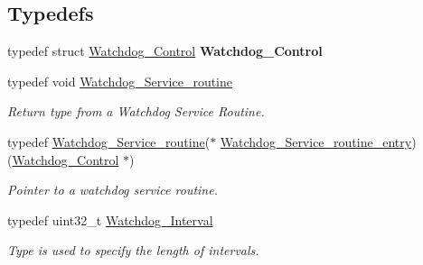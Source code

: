 \subsection*{Typedefs}
\begin{DoxyCompactItemize}
\item 
\mbox{\label{group__RTEMSScoreWatchdog_ga684404081cd268ce43ec92e6461771ab}} 
typedef struct \mbox{\hyperlink{structWatchdog__Control}{Watchdog\+\_\+\+Control}} {\bfseries Watchdog\+\_\+\+Control}
\item 
typedef void \mbox{\hyperlink{group__RTEMSScoreWatchdog_ga717c3247e44529ca6c68ead7baf52217}{Watchdog\+\_\+\+Service\+\_\+routine}}
\begin{DoxyCompactList}\small\item\em Return type from a Watchdog Service Routine. \end{DoxyCompactList}\item 
typedef \mbox{\hyperlink{group__RTEMSScoreWatchdog_ga717c3247e44529ca6c68ead7baf52217}{Watchdog\+\_\+\+Service\+\_\+routine}}($\ast$ \mbox{\hyperlink{group__RTEMSScoreWatchdog_ga6ae5e52f6c4046535272c18a8cba66e1}{Watchdog\+\_\+\+Service\+\_\+routine\+\_\+entry}}) (\mbox{\hyperlink{structWatchdog__Control}{Watchdog\+\_\+\+Control}} $\ast$)
\begin{DoxyCompactList}\small\item\em Pointer to a watchdog service routine. \end{DoxyCompactList}\item 
typedef uint32\+\_\+t \mbox{\hyperlink{group__RTEMSScoreWatchdog_gaa1834fd7531ca9bb5c4ca6fd990388d5}{Watchdog\+\_\+\+Interval}}
\begin{DoxyCompactList}\small\item\em Type is used to specify the length of intervals. \end{DoxyCompactList}\end{DoxyCompactItemize}
